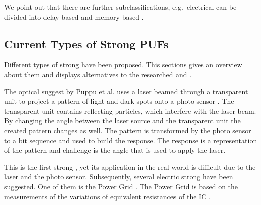 We point out that there are further subclassifications, e.g.\ electrical \pufs can be divided into delay based \pufs and memory based \pufs \cite{Saha2016TV-PUFPUF}.


\subsection{Current Types of Strong PUFs}
\label{sec:typesofpufs}

Different types of strong \pufs have been proposed.
This sections gives an overview about them and displays alternatives to the researched \apuf and \xpuf. 

The optical \puf suggest by Puppu et al. uses a laser beamed through a transparent unit to project a pattern of light and dark spots onto a photo sensor \cite{Pappu2001PhysicalFunctions}.
The transparent unit contains reflecting particles, which interfere with the laser beam.
By changing the angle between the laser source and the transparent unit the created pattern changes as well.
The pattern is transformed by the photo sensor to a bit sequence and used to build the response.
The \puf response is a representation of the pattern and challenge is the angle that is used to apply the laser.

This is the first strong \puf, yet its application in the real world is difficult due to the laser and the photo sensor.
Subsequently, several electric strong \puf have been suggested. %
One of them is the Power Grid \puf.
The Power Grid \puf is based on the measurements of the variations of equivalent resistances of the \ac{IC} \cite{Helinski2009AVariations}.

